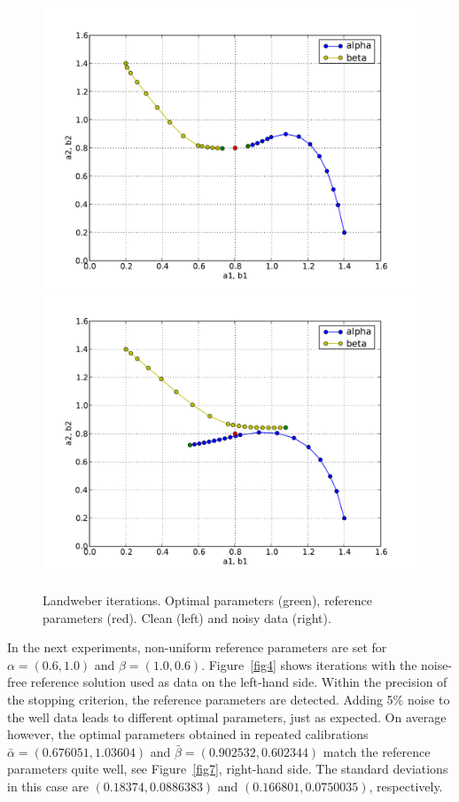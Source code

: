 \begin{figure}
  \centering
  \includegraphics[width=\twofigs]{chapters/schroll/pdf/4Dscan3.pdf}
  \includegraphics[width=\twofigs]{chapters/schroll/pdf/4Dscan3-5.pdf}
  \caption{Landweber iterations. Optimal parameters (green), reference
    parameters (red). Clean (left) and noisy data (right).}
  \label{fig3}
\end{figure}

In the next experiments, non-uniform reference parameters are set for
$\alpha = (0.6, 1.0)$ and $\beta = (1.0, 0.6)$.  Figure~\ref{fig4}
shows iterations with the noise-free reference solution used as data
on the left-hand side.  Within the precision of the stopping
criterion, the reference parameters are detected.  Adding 5\% noise to
the well data leads to different optimal parameters, just as expected.
On average however, the optimal parameters obtained in repeated
calibrations $\bar\alpha=(0.676051, 1.03604)$ and
$\bar\beta=(0.902532, 0.602344)$ match the reference parameters quite
well, see Figure~\ref{fig7}, right-hand side.  The standard deviations
in this case are $(0.18374, 0.0886383)$ and $(0.166801, 0.0750035)$,
respectively.

